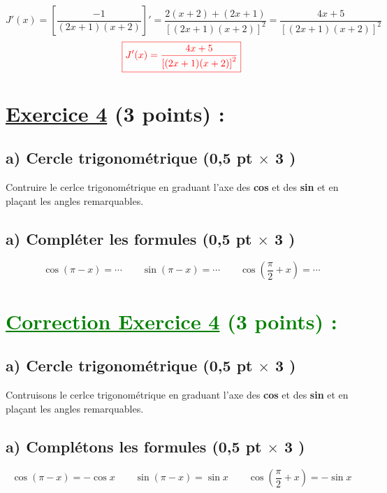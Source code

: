 \documentclass{article}
\begin{document}
\[J'(x)=\left[ \frac{-1}{(2x+1)(x+2)}\right]'=\frac{2(x+2)+(2x+1)}{\left[ (2x+1)(x+2)\right]^{2}}=\frac{4x+5}{\left[ (2x+1)(x+2)\right]^{2}}\]
\[\textcolor{red}{\boxed{J'(x)=\frac{4x+5}{\left[ (2x+1)(x+2)\right]^{2}}}}\]
\section*{\underline{Exercice 4} (3 points) :}
\subsection*{a) Cercle trigonométrique (0,5 pt $\times$ 3 )}
Contruire le cerlce trigonométrique en graduant l'axe des \textbf{cos} et des 
\textbf{sin} et en plaçant les angles remarquables.
\subsection*{a) Compléter les formules (0,5 pt $\times$ 3 )}
\[\cos(\pi-x)=\cdots\quad\quad \sin(\pi-x)=\cdots\quad\quad \cos(\frac{\pi}{2}+x)=\cdots\]
\section*{\textcolor{green}{\underline{Correction Exercice 4} (3 points) :}}
\subsection*{a) Cercle trigonométrique (0,5 pt $\times$ 3 )}
Contruisons le cerlce trigonométrique en graduant l'axe des \textbf{cos} et des 
\textbf{sin} et en plaçant les angles remarquables.
\subsection*{a) Complétons les formules (0,5 pt $\times$ 3 )}
\[\cos(\pi-x)=-\cos x \quad\quad \sin(\pi-x)=\sin x \quad\quad \cos(\frac{\pi}{2}+x)=-\sin x\]
\end{document}
